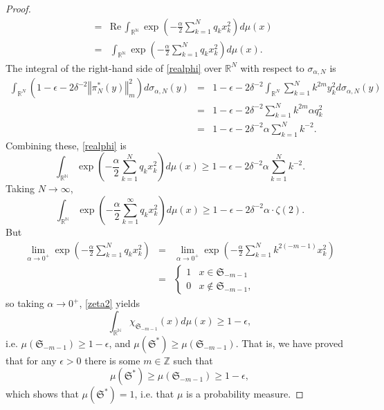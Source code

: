 \documentclass{article}
\def\Re{\ensuremath{\mathrm{Re}}\,}
\newcommand{\norm}[1]{\left\Vert #1 \right\Vert}
\theoremstyle{definition}
\begin{document}
\begin{proof}
\begin{eqnarray*}
&=&\Re \int_{\mathbb{R}^\mathbb{N}} \exp\left( -\frac{\alpha}{2}\sum_{k=1}^N q_k x_k^2 \right) d\mu(x)\\
&=& \int_{\mathbb{R}^\mathbb{N}} \exp\left( -\frac{\alpha}{2}\sum_{k=1}^N q_k x_k^2 \right) d\mu(x).
\end{eqnarray*}
The integral of the right-hand side of \eqref{realphi} over $\mathbb{R}^N$ with respect to $\sigma_{\alpha,N}$ is
\begin{eqnarray*}
\int_{\mathbb{R}^N} (1-\epsilon-2\delta^{-2} \norm{\pi_N^*(y)}_m^2) d\sigma_{\alpha,N}(y)&=&
1-\epsilon-2\delta^{-2}\int_{\mathbb{R}^N} \sum_{k=1}^N k^{2m} y_k^2 d\sigma_{\alpha,N}(y)\\
&=&1-\epsilon-2\delta^{-2} \sum_{k=1}^N k^{2m} \alpha q_k^2\\
&=&1-\epsilon-2\delta^{-2} \alpha \sum_{k=1}^N k^{-2}.
\end{eqnarray*}
Combining these, \eqref{realphi} is
\[
 \int_{\mathbb{R}^\mathbb{N}} \exp\left( -\frac{\alpha}{2}\sum_{k=1}^N q_k x_k^2 \right) d\mu(x) \geq 1-\epsilon-2\delta^{-2} \alpha \sum_{k=1}^N k^{-2}.
\]
Taking $N \to \infty$,
\begin{equation}
 \int_{\mathbb{R}^\mathbb{N}} \exp\left( -\frac{\alpha}{2}\sum_{k=1}^\infty q_k x_k^2 \right) d\mu(x) \geq 1-\epsilon-2\delta^{-2} \alpha \cdot \zeta(2).
 \label{zeta2}
\end{equation}
But  
\begin{eqnarray*}
\lim_{\alpha \to 0^+} \exp\left( -\frac{\alpha}{2}\sum_{k=1}^N q_k x_k^2 \right) 
&=&
\lim_{\alpha \to 0^+} \exp\left( -\frac{\alpha}{2}\sum_{k=1}^N k^{2(-m-1)} x_k^2 \right)\\
&=& \begin{cases}
1&x \in \mathfrak{S}_{-m-1}\\
0&x \not \in \mathfrak{S}_{-m-1},
\end{cases}
\end{eqnarray*}
so taking $\alpha \to 0^+$, \eqref{zeta2} yields
\[
\int_{\mathbb{R}^\mathbb{N}} \chi_{\mathfrak{S}_{-m-1}}(x) d\mu(x) \geq 1-\epsilon,
\]
i.e. $\mu(\mathfrak{S}_{-m-1}) \geq 1-\epsilon$, and $\mu(\mathfrak{S}^*) \geq \mu(\mathfrak{S}_{-m-1})$.
That is, we have proved that  for any $\epsilon>0$ there is some $m \in \mathbb{Z}$ such that
\[
\mu(\mathfrak{S}^*) \geq \mu(\mathfrak{S}_{-m-1}) \geq 1-\epsilon,
\]
which shows that $\mu(\mathfrak{S}^*)=1$, i.e. that $\mu$ is a probability measure.
\end{proof}
\end{document}
